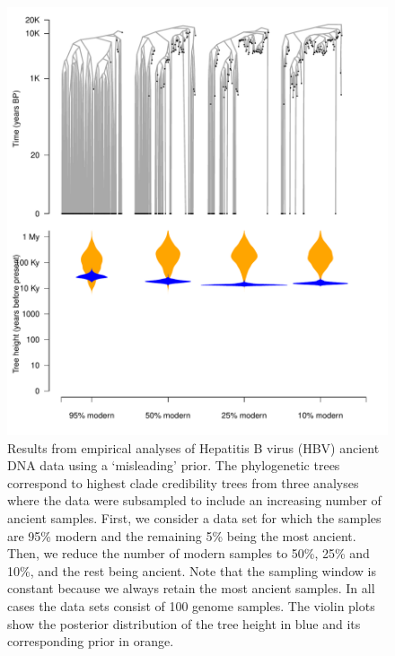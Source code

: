 \documentclass[11pt]{article}
\begin{document}
\begin{figure}[H]
    \begin{center}
        \includegraphics[scale=0.7, angle=0]{empirical_results_biased_misleading_prior_root_height.pdf}
        \caption{Results from empirical analyses of Hepatitis B virus (HBV) ancient DNA data using a `misleading' prior. The phylogenetic trees correspond to highest clade credibility trees from three analyses where the data were subsampled to include an increasing number of ancient samples. First, we consider a data set for which the samples are 95\% modern and the remaining 5\% being the most ancient. Then, we reduce the number of modern samples to 50\%, 25\% and 10\%, and the rest being ancient. Note that the sampling window is constant because we always retain the most ancient samples. In all cases the data sets consist of 100 genome samples. The violin plots show the posterior distribution of the tree height in blue and its corresponding prior in orange.}
        \label{figure:Fig5}
    \end{center}
\end{figure}
\end{document}
